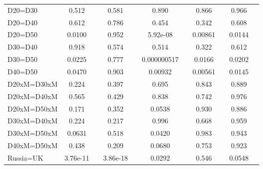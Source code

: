 \begin{tabular}{l|cccccc|cc|cc}
D20=D30         &    0.512         &         &    0.581         &         &    0.890         &         &    0.866         &         &    0.966         &         \\
D20=D40         &    0.612         &         &    0.786         &         &    0.454         &         &    0.342         &         &    0.608         &         \\
D20=D50         &   0.0100         &         &    0.952         &         & 5.92e-08         &         &  0.00861         &         &   0.0144         &         \\
D30=D40         &    0.918         &         &    0.574         &         &    0.514         &         &    0.322         &         &    0.612         &         \\
D30=D50         &   0.0225         &         &    0.777         &         &0.000000517         &         &   0.0166         &         &   0.0202         &         \\
D40=D50         &   0.0470         &         &    0.903         &         &  0.00932         &         &  0.00561         &         &   0.0145         &         \\
D20xM=D30xM     &    0.224         &         &    0.397         &         &    0.695         &         &    0.843         &         &    0.889         &         \\
D20xM=D40xM     &    0.565         &         &    0.429         &         &    0.838         &         &    0.742         &         &    0.976         &         \\
D20xM=D50xM     &    0.171         &         &    0.352         &         &   0.0538         &         &    0.930         &         &    0.886         &         \\
D30xM=D40xM     &    0.224         &         &    0.217         &         &    0.996         &         &    0.668         &         &    0.959         &         \\
D30xM=D50xM     &   0.0631         &         &    0.518         &         &   0.0420         &         &    0.983         &         &    0.943         &         \\
D40xM=D50xM     &    0.438         &         &    0.209         &         &   0.0680         &         &    0.753         &         &    0.923         &         \\
Russia=UK       & 3.76e-11         &         & 3.86e-18         &         &   0.0292         &         &    0.546         &         &   0.0548         &         \\

\end{tabular}
